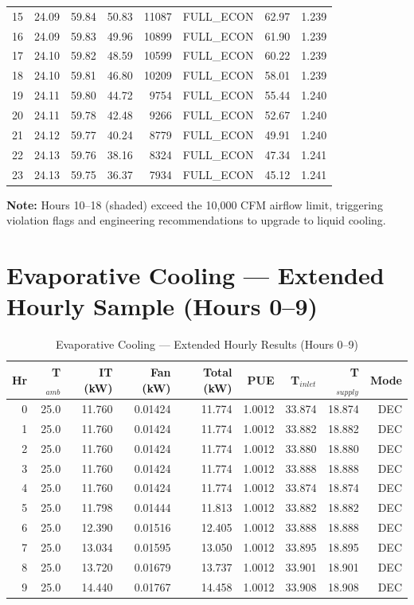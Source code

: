 \documentclass[12pt,a4paper]{report}
\begin{document}
\begin{longtable}{rrrrrrrr}
15 & 24.09 & 59.84 & 50.83 & 11087 & FULL\_ECON & 62.97 & 1.239 \\
16 & 24.09 & 59.83 & 49.96 & 10899 & FULL\_ECON & 61.90 & 1.239 \\
17 & 24.10 & 59.82 & 48.59 & 10599 & FULL\_ECON & 60.22 & 1.239 \\
18 & 24.10 & 59.81 & 46.80 & 10209 & FULL\_ECON & 58.01 & 1.239 \\
19 & 24.11 & 59.80 & 44.72 & 9754 & FULL\_ECON & 55.44 & 1.240 \\
20 & 24.11 & 59.78 & 42.48 & 9266 & FULL\_ECON & 52.67 & 1.240 \\
21 & 24.12 & 59.77 & 40.24 & 8779 & FULL\_ECON & 49.91 & 1.240 \\
22 & 24.13 & 59.76 & 38.16 & 8324 & FULL\_ECON & 47.34 & 1.241 \\
23 & 24.13 & 59.75 & 36.37 & 7934 & FULL\_ECON & 45.12 & 1.241 \\
\end{longtable}

\noindent\textbf{Note:} Hours 10--18 (shaded) exceed the 10{,}000 CFM airflow limit, triggering
violation flags and engineering recommendations to upgrade to liquid cooling.

\section{Evaporative Cooling --- Extended Hourly Sample (Hours 0--9)}

\begin{table}[H]
\centering
\caption{Evaporative Cooling --- Extended Hourly Results (Hours 0--9)}
\label{tab:evap_10hr}
\renewcommand{\arraystretch}{1.2}
\scriptsize
\begin{tabular}{rrrrrrrrr}
\toprule
\textbf{Hr} & \textbf{T$_{amb}$} & \textbf{IT (kW)} & \textbf{Fan (kW)} & \textbf{Total (kW)} & \textbf{PUE} & \textbf{T$_{inlet}$} & \textbf{T$_{supply}$} & \textbf{Mode} \\
\midrule
0 & 25.0 & 11.760 & 0.01424 & 11.774 & 1.0012 & 33.874 & 18.874 & DEC \\
1 & 25.0 & 11.760 & 0.01424 & 11.774 & 1.0012 & 33.882 & 18.882 & DEC \\
2 & 25.0 & 11.760 & 0.01424 & 11.774 & 1.0012 & 33.880 & 18.880 & DEC \\
3 & 25.0 & 11.760 & 0.01424 & 11.774 & 1.0012 & 33.888 & 18.888 & DEC \\
4 & 25.0 & 11.760 & 0.01424 & 11.774 & 1.0012 & 33.874 & 18.874 & DEC \\
5 & 25.0 & 11.798 & 0.01444 & 11.813 & 1.0012 & 33.882 & 18.882 & DEC \\
6 & 25.0 & 12.390 & 0.01516 & 12.405 & 1.0012 & 33.888 & 18.888 & DEC \\
7 & 25.0 & 13.034 & 0.01595 & 13.050 & 1.0012 & 33.895 & 18.895 & DEC \\
8 & 25.0 & 13.720 & 0.01679 & 13.737 & 1.0012 & 33.901 & 18.901 & DEC \\
9 & 25.0 & 14.440 & 0.01767 & 14.458 & 1.0012 & 33.908 & 18.908 & DEC \\
\bottomrule
\end{tabular}
\end{table}
\end{document}
